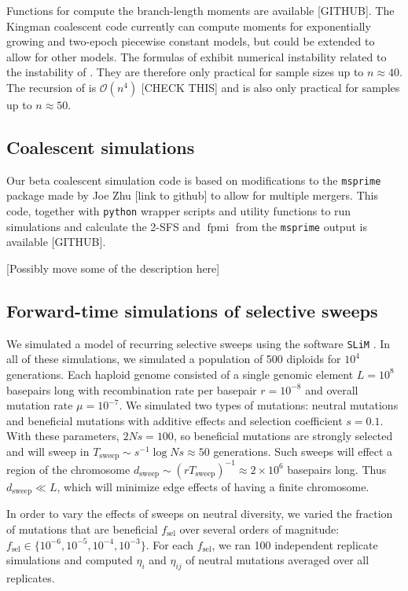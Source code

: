 \documentclass[11pt, letterpaper]{article}   	%
\DeclareMathOperator{\fpmi}{fpmi}
\begin{document}
Functions for compute the branch-length moments are available [GITHUB].
The Kingman coalescent code currently can compute moments for exponentially growing and two-epoch piecewise constant models, but could be extended to allow for other models.
The formulas of \cite{ZivkovicWiehe2008} exhibit numerical instability related to the instability of \cite{GriffithsTavare1994}.
They are therefore only practical for sample sizes up to $n \approx 40$.
The recursion of \cite{BirknerEtAl2013} is $\mathcal{O}(n^4)$ [CHECK THIS] and is also only practical for samples up to $n \approx 50$.

\subsection*{Coalescent simulations}

Our beta coalescent simulation code is based on modifications to the \texttt{msprime} package made by Joe Zhu [link to github] to allow for multiple mergers.
This code, together with \texttt{python} wrapper scripts and utility functions to run simulations and calculate the 2-SFS and $\fpmi$ from the \texttt{msprime} output is available [GITHUB].

[Possibly move some of the description here]

\subsection*{Forward-time simulations of selective sweeps}

We simulated a model of recurring selective sweeps using the software \texttt{SLiM} \autocite{MesserEtAl201?}.
In all of these simulations, we simulated a population of 500 diploids for $10^4$ generations.
Each haploid genome consisted of a single genomic element $L=10^8$ basepairs long with recombination rate per basepair $r = 10^{-8}$ and overall mutation rate $\mu = 10^{-7}$.
We simulated two types of mutations: neutral mutations and beneficial mutations with additive effects and selection coefficient $s=0.1$.
With these parameters, $2Ns = 100$, so beneficial mutations are strongly selected and will sweep in $T_{\text{sweep}}\sim s^{-1} \log Ns \approx 50$ generations.
Such sweeps will effect a region of the chromosome $d_{\text{sweep}} \sim (r T_{\text{sweep}})^{-1} \approx 2 \times 10^6$ basepairs long.
Thus $d_{\text{sweep}} \ll L$, which will minimize edge effects of having a finite chromosome.

In order to vary the effects of sweeps on neutral diversity, we varied the fraction of mutations that are beneficial $f_{\text{sel}}$ over several orders of magnitude: $f_{\text{sel}} \in \{10^{-6}, 10^{-5}, 10^{-4}, 10^{-3}\}$.
For each $f_{\text{sel}}$, we ran 100 independent replicate simulations and computed $\eta_i$ and $\eta_{ij}$ of neutral mutations averaged over all replicates.
\end{document}
